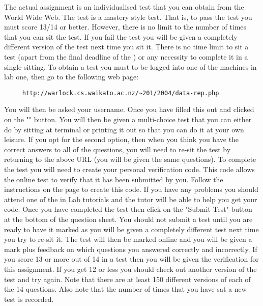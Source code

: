 \documentclass[a4paper,10pt]{article}
\begin{document}
The actual assignment is an individualised test that 
you can obtain from the World Wide Web. The
test is a mastery style test. That is, to pass the 
test you must score 13/14 or better. However, there is
no limit to the number of times that you can sit the 
test. If you fail the test you will be given a
completely different version of the test next 
time you sit it. There is no time limit to sit a test (apart
from the final deadline of the \DATADUE) or 
any necessity to complete it in a single sitting. To obtain a
test you must to be logged into one of the 
machines in lab one, then go to the following web page:

\begin{verbatim}
     http://warlock.cs.waikato.ac.nz/~201/2004/data-rep.php
\end{verbatim}

You will then be asked your username. Once you have filled this out
and clicked on the "" button. You will then be given a
multi-choice test that you can either do by sitting at terminal or
printing it out so that you can do it at your own leisure. If you opt
for the second option, then when you think you have the correct
answers to all of the questions, you will need to re-sit the test by
returning to the above URL (you will be given the same questions). To
complete the test you will need to create your personal verification
code. This code allows the online test to verify that it has been
submitted by you. Follow the instructions on the page to create this
code. If you have any problems you should attend one of the in Lab
tutorials and the tutor will be able to help you get your code. Once
you have completed the test then click on the "Submit Test" button at
the bottom of the question sheet. You should not submit a test until
you are ready to have it marked as you will be given a completely
different test next time you try to re-sit it.  The test will then be
marked online and you will be given a mark plus feedback on which
questions you answered correctly and incorrectly. If you score 13 or
more out of 14 in a test then you will be given the verification for
this assignment. If you get 12 or less you should check out another
version of the test and try again. Note that there are at least 150
different versions of each of the 14 questions.  Also note that the
number of times that you have sat a new test is recorded.

\thispagestyle{rcsfooters}
\pagestyle{rcsfooters}
\end{document}
